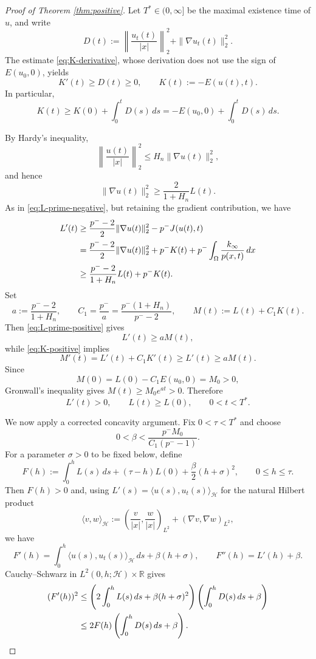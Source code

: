 \documentclass[10pt,a4paper]{amsart}
\begin{document}
\begin{proof}[Proof of Theorem \ref{thm:positive}]
	Let $T^*\in(0,\infty]$ be the maximal existence time of $u$, and write
	\[
	D(t):=\left\|\frac{u_t(t)}{|x|}\right\|_2^2+\|\nabla u_t(t)\|_2^2.
	\]
	The estimate \eqref{eq:K-derivative}, whose derivation does not use the sign of $E(u_0,0)$, yields
	\begin{equation}\label{eq:K-positive}
	K'(t)\ge D(t)\ge0,
	\qquad K(t):=-E(u(t),t).
	\end{equation}
	In particular,
	\begin{equation}\label{eq:K-integrated}
	K(t)\ge K(0)+\int_0^tD(s)\,ds
	=-E(u_0,0)+\int_0^tD(s)\,ds.
	\end{equation}

	By Hardy's inequality,
	\[
	\left\|\frac{u(t)}{|x|}\right\|_2^2\le H_n\|\nabla u(t)\|_2^2,
	\]
	and hence
	\begin{equation}\label{eq:gradient-controls-L}
	\|\nabla u(t)\|_2^2
	\ge \frac{2}{1+H_n}L(t).
	\end{equation}
	As in \eqref{eq:L-prime-negative}, but retaining the gradient contribution, we have
	\begin{align}
	L'(t)
	&\ge \frac{p^- -2}{2}\|\nabla u(t)\|_2^2-p^-J(u(t),t) \notag\\
	&=\frac{p^- -2}{2}\|\nabla u(t)\|_2^2
	+p^-K(t)+p^-\int_\Omega\frac{k_\infty}{p(x,t)}\,dx \notag\\
	&\ge \frac{p^- -2}{1+H_n}L(t)+p^-K(t). \label{eq:L-prime-positive}
	\end{align}
	Set
	\[
	a:=\frac{p^- -2}{1+H_n},
	\qquad
	C_1=\frac{p^-}{a}=\frac{p^-(1+H_n)}{p^- -2},
	\qquad
	M(t):=L(t)+C_1K(t).
	\]
	Then \eqref{eq:L-prime-positive} gives
	\[
	L'(t)\ge aM(t),
	\]
	while \eqref{eq:K-positive} implies
	\[
	M'(t)=L'(t)+C_1K'(t)\ge L'(t)\ge aM(t).
	\]
	Since
	\[
	M(0)=L(0)-C_1E(u_0,0)=M_0>0,
	\]
	Gronwall's inequality gives $M(t)\ge M_0e^{at}>0$. Therefore
	\begin{equation}\label{eq:L-increasing}
	L'(t)>0,
	\qquad L(t)\ge L(0),
	\qquad 0<t<T^*.
	\end{equation}

	We now apply a corrected concavity argument. Fix $0<\tau<T^*$ and choose
	\begin{equation}\label{eq:beta-choice}
	0<\beta<\frac{p^-M_0}{C_1(p^- -1)}.
	\end{equation}
	For a parameter $\sigma>0$ to be fixed below, define
	\[
	F(h):=\int_0^hL(s)\,ds+(\tau-h)L(0)+\frac{\beta}{2}(h+\sigma)^2,
	\qquad 0\le h\le\tau.
	\]
	Then $F(h)>0$ and, using $L'(s)=\langle u(s),u_t(s)\rangle_{\mathcal H}$ for the natural Hilbert product
	\[
	\langle v,w\rangle_{\mathcal H}
	:=\left(\frac{v}{|x|},\frac{w}{|x|}\right)_{L^2}
	+(\nabla v,\nabla w)_{L^2},
	\]
	we have
	\[
	F'(h)=\int_0^h\langle u(s),u_t(s)\rangle_{\mathcal H}\,ds
	+\beta(h+\sigma),
	\qquad
	F''(h)=L'(h)+\beta.
	\]
	Cauchy--Schwarz in $L^2(0,h;\mathcal H)\times\mathbb R$ gives
	\begin{align}
	(F'(h))^2
	&\le\left(2\int_0^hL(s)\,ds+\beta(h+\sigma)^2\right)
	\left(\int_0^hD(s)\,ds+\beta\right)\notag\\
	&\le 2F(h)\left(\int_0^hD(s)\,ds+\beta\right). \label{eq:F-CS}
	\end{align}


\end{proof}
\end{document}

